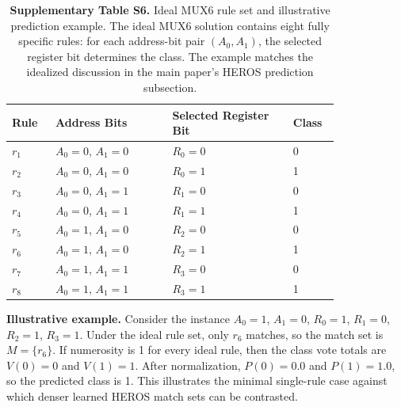 \documentclass[11pt]{article}
\begin{document}
\begin{table}[H]
\caption*{\textbf{Supplementary Table S6.} Ideal MUX6 rule set and illustrative prediction example. The ideal MUX6 solution contains eight fully specific rules: for each address-bit pair $(A_0,A_1)$, the selected register bit determines the class. The example matches the idealized discussion in the main paper's HEROS prediction subsection.}
\label{tab:ideal-mux6-supp}
\centering
\small
\setlength{\tabcolsep}{5pt}
\renewcommand{\arraystretch}{1.08}
\begin{tabular}{@{}C{0.11\linewidth}L{0.30\linewidth}L{0.31\linewidth}C{0.10\linewidth}@{}}
\toprule
\textbf{Rule} & \textbf{Address Bits} & \textbf{Selected Register Bit} & \textbf{Class} \\
\midrule
$r_1$ & $A_0=0$, $A_1=0$ & $R_0=0$ & 0 \\
$r_2$ & $A_0=0$, $A_1=0$ & $R_0=1$ & 1 \\
$r_3$ & $A_0=0$, $A_1=1$ & $R_1=0$ & 0 \\
$r_4$ & $A_0=0$, $A_1=1$ & $R_1=1$ & 1 \\
$r_5$ & $A_0=1$, $A_1=0$ & $R_2=0$ & 0 \\
$r_6$ & $A_0=1$, $A_1=0$ & $R_2=1$ & 1 \\
$r_7$ & $A_0=1$, $A_1=1$ & $R_3=0$ & 0 \\
$r_8$ & $A_0=1$, $A_1=1$ & $R_3=1$ & 1 \\
\bottomrule
\end{tabular}
\par\smallskip
\begin{minipage}{0.92\linewidth}
\textbf{Illustrative example.} Consider the instance $A_0=1$, $A_1=0$, $R_0=1$, $R_1=0$, $R_2=1$, $R_3=1$. Under the ideal rule set, only $r_6$ matches, so the match set is $M=\{r_6\}$. If numerosity is 1 for every ideal rule, then the class vote totals are $V(0)=0$ and $V(1)=1$. After normalization, $P(0)=0.0$ and $P(1)=1.0$, so the predicted class is 1. This illustrates the minimal single-rule case against which denser learned HEROS match sets can be contrasted.
\end{minipage}
\end{table}
\end{document}
